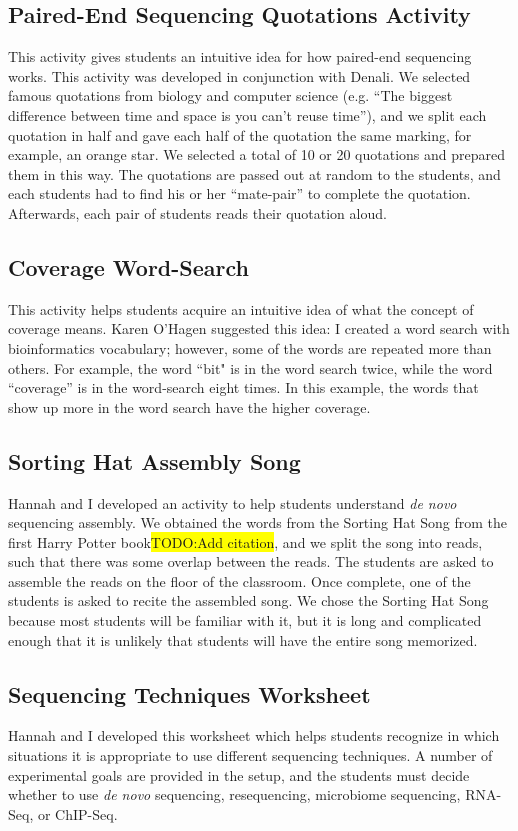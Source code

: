 \documentclass{report}
\newcommand{\hilight}[1]
{\colorbox{yellow}{#1}}
\begin{document}
\subsection{Paired-End Sequencing Quotations Activity}
This activity gives students an intuitive idea for how paired-end sequencing works. This activity was developed in conjunction with Denali. We selected famous quotations from biology and computer science (e.g. ``The biggest difference between time and space is you can't reuse time''), and we split each quotation in half and gave each half of the quotation the same marking, for example, an orange star. We selected a total of 10 or 20 quotations and prepared them in this way. The quotations are passed out at random to the students, and each students had to find his or her ``mate-pair'' to complete the quotation. Afterwards, each pair of students reads their quotation aloud.

\subsection{Coverage Word-Search}
This activity helps students acquire an intuitive idea of what the concept of coverage means. Karen O'Hagen suggested this idea: I created a word search with bioinformatics vocabulary; however, some of the words are repeated more than others. For example, the word ``bit" is in the word search twice, while the word ``coverage'' is in the word-search eight times. In this example, the words that show up more in the word search have the higher coverage.

\subsection{Sorting Hat Assembly Song}
Hannah and I developed an activity to help students understand \emph{de novo} sequencing assembly. We obtained the words from the Sorting Hat Song from the first Harry Potter book\hilight{TODO:Add citation}, and we split the song into reads, such that there was some overlap between the reads. The students are asked to assemble the reads on the floor of the classroom. Once complete,  one of the students is asked to recite the assembled song. We chose the Sorting Hat Song because most students will be familiar with it, but it is long and complicated enough that it is unlikely that students will have the entire song memorized. 

\subsection{Sequencing Techniques Worksheet}
Hannah and I developed this worksheet which helps students recognize in which situations it is appropriate to use different sequencing techniques. A number of experimental goals are provided in the setup, and the students must decide whether to use \emph{de novo} sequencing, resequencing, microbiome sequencing, RNA-Seq, or ChIP-Seq.
\end{document}

